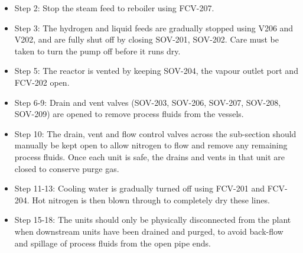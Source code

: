 \begin{itemize}
    \item Step 2: Stop the steam feed to reboiler using FCV-207. 
    \item Step 3: The hydrogen and liquid feeds are gradually stopped using V206 and V202, and are fully shut off by closing SOV-201, SOV-202. Care must be taken to turn the pump off before it runs dry. 
    \item Step 5: The reactor is vented by keeping SOV-204, the vapour outlet port and FCV-202 open.
    \item Step 6-9: Drain and vent valves (SOV-203, SOV-206, SOV-207, SOV-208, SOV-209) are opened to remove process fluids from the vessels.
    \item Step 10: The drain, vent and flow control valves across the sub-section should manually be kept open to allow nitrogen to flow and remove any remaining process fluids. Once each unit is safe, the drains and vents in that unit are closed to conserve purge gas. 
    \item Step 11-13: Cooling water is gradually turned off using FCV-201 and FCV-204. Hot nitrogen is then blown through to completely dry these lines.
    \item Step 15-18: The units should only be physically disconnected from the plant when downstream units have been drained and purged, to avoid back-flow and spillage of process fluids from the open pipe ends.
\end{itemize}